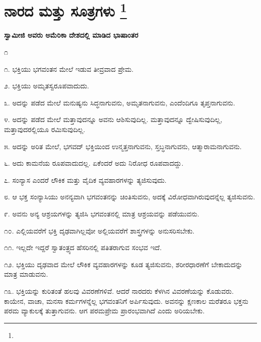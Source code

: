 
\chapter[ನಾರದ ಮತ್ತು ಸೂತ್ರಗಳು ]{ನಾರದ ಮತ್ತು ಸೂತ್ರಗಳು \protect\footnote{}}

\centerline{\textbf{ಸ್ವಾಮೀಜಿ ಅವರು ಅಮೆರಿಕಾ ದೇಶದಲ್ಲಿ ಮಾಡಿದ ಭಾಷಾಂತರ}}

\begin{center}
೧
\end{center}

೧. ಭಕ್ತಿಯು ಭಗವಂತನ ಮೇಲೆ ಇಡುವ ತೀವ್ರವಾದ ಪ್ರೇಮ.

\vskip 3pt

೨. ಭಕ್ತಿಯು ಅಮೃತಸ್ವರೂಪವಾದುದು.

\vskip 2pt

೩. ಅದನ್ನು ಪಡೆದ ಮೇಲೆ ಮನುಷ್ಯನು ಸಿದ್ಧನಾಗುವನು, ಅಮೃತನಾಗುವನು, ಎಂದೆಂದಿಗೂ ತೃಪ್ತನಾಗುವನು.

\vskip 2pt

೪. ಅದನ್ನು ಪಡೆದ ಮೇಲೆ ಮತ್ತಾವುದನ್ನೂ ಅವನು ಆಶಿಸುವುದಿಲ್ಲ. ಮತ್ತಾವುದನ್ನೂ ದ್ವೇಷಿಸುವುದಿಲ್ಲ, ಮತ್ತಾವುದರಲ್ಲಿಯೂ ರಮಿಸುವುದಿಲ್ಲ.

\vskip 2pt

೫. ಅದನ್ನು ಅರಿತ ಮೇಲೆ, ಭಗವದ್​ ಭಕ್ತಿಯಿಂದ ಉನ್ಮತ್ತನಾಗುವನು, ಸ್ತಬ್ಧನಾಗುವನು, ಆತ್ಮಾರಾಮನಾಗುವನು.

\vskip 2pt

೬. ಅದು ಕಾಮನೆಯ ರೂಪವಾದುದಲ್ಲ. ಏಕೆಂದರೆ ಅದು ನಿರೋಧ ರೂಪವಾದದ್ದು.

\vskip 2pt

೭. ಸಂನ್ಯಾಸ ಎಂದರೆ ಲೌಕಿಕ ಮತ್ತು ವೈದಿಕ ವ್ಯವಹಾರಗಳನ್ನು ತ್ಯಜಿಸುವುದು.

\vskip 2pt

೮. ಆ ಭಕ್ತ ಸಂನ್ಯಾಸಿಯು ಅನನ್ಯವಾಗಿ ಭಗವಂತನನ್ನು ಚಿಂತಿಸುವನು, ಅದಕ್ಕೆ ವಿರೋಧವಾಗಿರುವುದನ್ನೆಲ್ಲ ತ್ಯಜಿಸುವನು.

\vskip 2pt

೯. ಅವನು ಅನ್ಯ ಆಶ್ರಯಗಳನ್ನು ತ್ಯಜಿಸಿ ಭಗವಂತನಲ್ಲಿ ಮಾತ್ರ ಆಶ್ರಯವನ್ನು ಪಡೆಯುವನು.

\vskip 2pt

೧೦. ಎಲ್ಲಿಯವರೆಗೆ ಭಕ್ತಿ ದೃಢವಾಗಿಲ್ಲವೋ ಅಲ್ಲಿಯವರೆಗೆ ಶಾಸ್ತ್ರಗಳನ್ನು ಅನುಸರಿಸಬೇಕು.

\vskip 2pt

೧೧. ಇಲ್ಲದೇ ಇದ್ದರೆ ಸ್ವಾತಂತ್ರ್ಯದ ಹೆಸರಿನಲ್ಲಿ ಪತಿತರಾಗುವ ಸಂಭವ ಇದೆ.

\vskip 2pt

೧೨. ಭಕ್ತಿಯು ದೃಢವಾದ ಮೇಲೆ ಲೌಕಿಕ ವ್ಯವಹಾರಗಳನ್ನು ಕೂಡ ತ್ಯಜಿಸುವನು, ಶರೀರಧಾರಣೆಗೆ ಬೇಕಾದುದನ್ನು ಮಾತ್ರ ಮಾಡುವನು.

೧೩. ಭಕ್ತಿಯನ್ನು ಕುರಿತಂತೆ ಹಲವು ವಿವರಣೆಗಳಿವೆ. ಆದರೆ ನಾರದರು ಕೆಳಗಿನ ವಿವರಣೆಯನ್ನು ಕೊಡುವರು. ಕಾಯೇನ, ವಾಚಾ, ಮನಸಾ ಕರ್ಮಗಳನ್ನೆಲ್ಲ ಭಗವಂತನಿಗೆ ಅರ್ಪಿಸುವುದು. ಅವನನ್ನು ಕ್ಷಣಕಾಲ ಮರೆತರೂ ಭಕ್ತನು ಪರಮ ವ್ಯಾಕುಲಕ್ಕೆ ತುತ್ತಾಗುವನು. ಆಗ ಪರಮಪ್ರೇಮ ಪ್ರಾರಂಭವಾಗಿದೆ ಎಂದು ಅರಿಯಬೇಕು.

